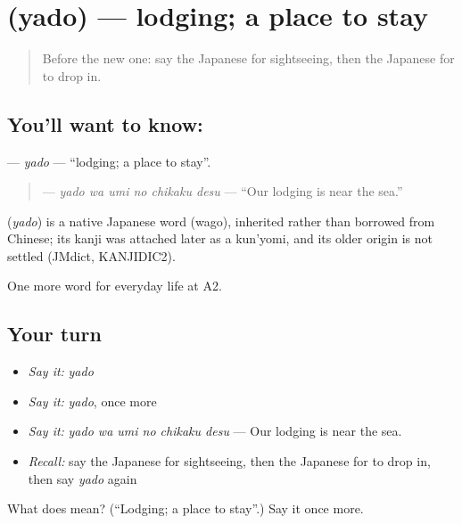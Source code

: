 \section[\texorpdfstring{\ja{やど} (yado)}{やど (yado)}]{ (yado) — lodging; a place to stay}

\label{lesson:JA-C204-yado}



\begin{quote}
Before the new one: say the Japanese for sightseeing, then the Japanese for to drop in.
\end{quote}

\subsection*{You'll want to know: }
\textbf{} — \emph{yado} — \textquotedblleft{}lodging; a place to stay\textquotedblright{}.

\begin{quote}
\textbf{  } — \emph{yado wa umi no chikaku desu} — \textquotedblleft{}Our lodging is near the sea.\textquotedblright{}
\end{quote}

\begin{cousinweb}
\textbf{} (\emph{yado}) is a native Japanese word (wago), inherited rather than borrowed from Chinese; its kanji was attached later as a kun'yomi, and its older origin is not settled (JMdict, KANJIDIC2).
\end{cousinweb}

\begin{grammarlens}[title={What you've built}]
One more word for everyday life at A2.
\end{grammarlens}

\subsection*{Your turn}
\begin{itemize}
\raggedright
  \item \emph{Say it:} \emph{yado}
  \item \emph{Say it:} \emph{yado}, once more
  \item \emph{Say it:} \emph{yado wa umi no chikaku desu} — Our lodging is near the sea.
  \item \emph{Recall:} say the Japanese for sightseeing, then the Japanese for to drop in, then say \emph{yado} again
\end{itemize}

\begin{tcolorbox}[breakable,colback=teal!4,colframe=teal!35!black,title={Before you move on}]
What does  mean? (\textquotedblleft{}Lodging; a place to stay\textquotedblright{}.) Say it once more.
\end{tcolorbox}
